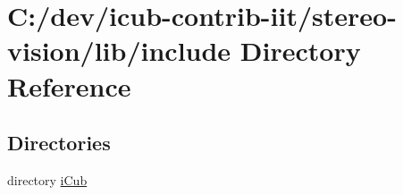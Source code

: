\section{C\+:/dev/icub-\/contrib-\/iit/stereo-\/vision/lib/include Directory Reference}
\label{dir_5a30104352ef4255dc24354b02eb2d20}
\subsection*{Directories}
\begin{DoxyCompactItemize}
\item 
directory \hyperlink{dir_05906369c2d654c318c8e5f0b9121080}{i\+Cub}
\end{DoxyCompactItemize}
